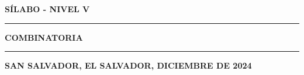
\begin{center}

{\bf \Large SÍLABO - NIVEL V}\\  
\vspace{0.3ex}%
\rule{\textwidth}{2pt}
{\Huge \bf COMBINATORIA\\  
\vspace{0.7ex}%
\rule{\textwidth}{2pt}
 }
\end{center}

\vspace{0.3cm}

\begin{center}
\end{center}

\vspace{0.3cm}

\begin{center}
{\bf SAN SALVADOR, EL SALVADOR, DICIEMBRE DE 2024}
\end{center}







